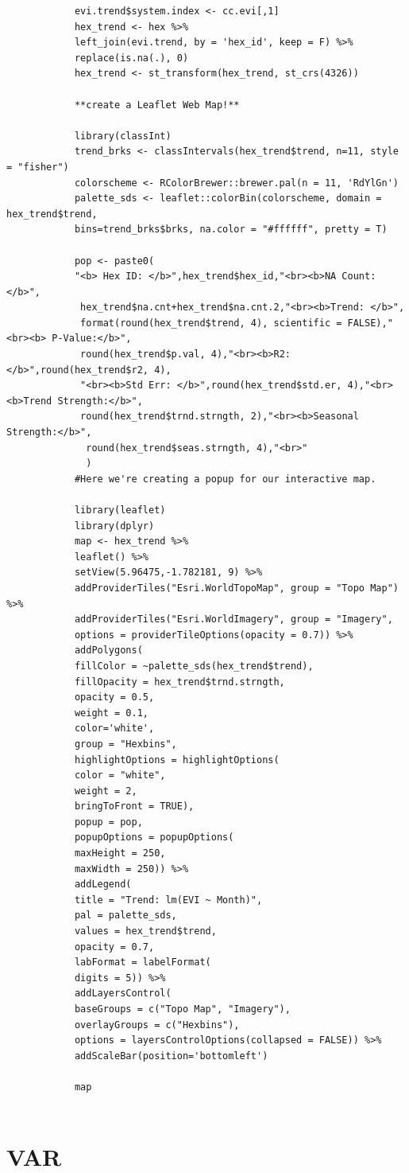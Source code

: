 \documentclass[12pt,a4paper]{book}
\begin{document}
\begin{shaded}
\begin{verbatim}
			evi.trend$system.index <- cc.evi[,1]
			hex_trend <- hex %>%
			left_join(evi.trend, by = 'hex_id', keep = F) %>%
			replace(is.na(.), 0)
			hex_trend <- st_transform(hex_trend, st_crs(4326))	
			
			**create a Leaflet Web Map!**			
			
			library(classInt)
			trend_brks <- classIntervals(hex_trend$trend, n=11, style = "fisher")
			colorscheme <- RColorBrewer::brewer.pal(n = 11, 'RdYlGn')
			palette_sds <- leaflet::colorBin(colorscheme, domain = hex_trend$trend, 
			bins=trend_brks$brks, na.color = "#ffffff", pretty = T)
			
			pop <- paste0(
			"<b> Hex ID: </b>",hex_trend$hex_id,"<br><b>NA Count:</b>",
			 hex_trend$na.cnt+hex_trend$na.cnt.2,"<br><b>Trend: </b>",
			 format(round(hex_trend$trend, 4), scientific = FALSE),"<br><b> P-Value:</b>",
			 round(hex_trend$p.val, 4),"<br><b>R2: </b>",round(hex_trend$r2, 4),
			 "<br><b>Std Err: </b>",round(hex_trend$std.er, 4),"<br><b>Trend Strength:</b>",
			 round(hex_trend$trnd.strngth, 2),"<br><b>Seasonal Strength:</b>",
			  round(hex_trend$seas.strngth, 4),"<br>"
			  )
			#Here we're creating a popup for our interactive map.			
			
			library(leaflet)
			library(dplyr)
			map <- hex_trend %>%
			leaflet() %>%
			setView(5.96475,-1.782181, 9) %>%
			addProviderTiles("Esri.WorldTopoMap", group = "Topo Map") %>%
			addProviderTiles("Esri.WorldImagery", group = "Imagery", 
			options = providerTileOptions(opacity = 0.7)) %>%
			addPolygons(
			fillColor = ~palette_sds(hex_trend$trend),
			fillOpacity = hex_trend$trnd.strngth,
			opacity = 0.5,
			weight = 0.1,
			color='white', 
			group = "Hexbins", 
			highlightOptions = highlightOptions(
			color = "white",
			weight = 2,
			bringToFront = TRUE),
			popup = pop,
			popupOptions = popupOptions(
			maxHeight = 250, 
			maxWidth = 250)) %>%
			addLegend(
			title = "Trend: lm(EVI ~ Month)",
			pal = palette_sds,
			values = hex_trend$trend,
			opacity = 0.7,
			labFormat = labelFormat(
			digits = 5)) %>%
			addLayersControl(
			baseGroups = c("Topo Map", "Imagery"),
			overlayGroups = c("Hexbins"),
			options = layersControlOptions(collapsed = FALSE)) %>%
			addScaleBar(position='bottomleft')
			
			map
			
		\end{verbatim}
	\end{shaded}
	\section{VAR}
	
\end{document}
